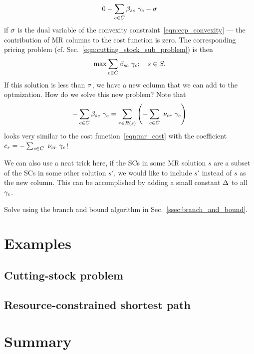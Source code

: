 \documentclass[letterpaper, 10pt, twocolumn, reqno]{amsart}
\begin{document}
{\begin{enumerate}[(a)]
            $$
            0 - \sum_{c \in C} \beta_{sc}\ \gamma_c - \sigma
            $$
            if $\sigma$ is the dual variable of the convexity constraint~\eqref{eqn:ecp_convexity} --- the contribution of MR columns to the cost function is zero. The corresponding pricing problem (cf. Sec.~\ref{eqn:cutting_stock_sub_problem}) is then
            $$
            \max \sum_{c \in C} \beta_{sc}\ \gamma_c; \quad s \in S.
            $$
            If this solution is less than $\sigma$, we have a new column that we can add to the optmization. How do we solve this new problem? Note that
            $$
            -\sum_{c \in C} \beta_{sc}\ \gamma_c = \sum_{r \in R(s)} \left(-\sum_{c \in C}\ \nu_{cr}\ \gamma_c\right)
            $$
            looks very similar to the cost function~\eqref{eqn:mr_cost} with the coefficient $c_r = -\sum_{c \in C}\ \nu_{cr}\ \g_c$!

            We can also use a neat trick here, if the SCs in some MR solution $s$ are a subset of the SCs in some other solution $s'$, we would like to include $s'$ instead of $s$ as the new column. This can be accomplished by adding a small constant $\Delta$ to all $\gamma_c$.
        \end{enumerate}

    \item Solve using the branch and bound algorithm in Sec.~\ref{ssec:branch_and_bound}.

}

\section{Examples}
\label{sec:examples}

\subsection{Cutting-stock problem}
\label{ssec:eg_cutting_stock}



\subsection{Resource-constrained shortest path}
\label{ssec:eg_shortest_path}


\section{Summary}
\label{sec:summary}


{
\footnotesize


}
\end{document}
